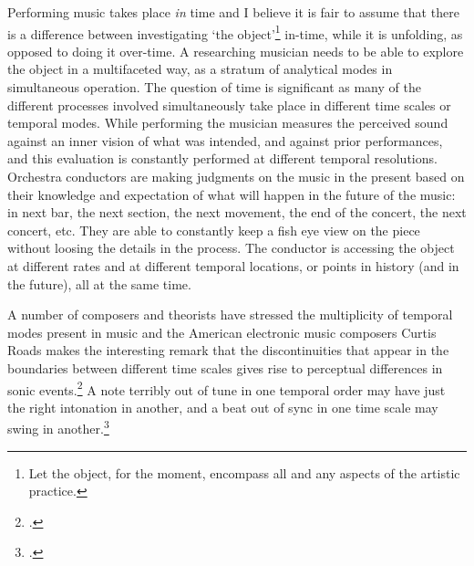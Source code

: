 Performing music takes place \emph{in} time and I believe it is fair to assume that there is a difference between investigating `the object'\footnote{Let the object, for the moment, encompass all and any aspects of the artistic practice.} in-time, while it is unfolding, as opposed to doing it over-time. A researching musician needs to be able to explore the object in a multifaceted way, as a stratum of analytical modes in simultaneous operation. The question of time is significant as many of the different processes involved simultaneously take place in  different time scales or temporal modes. While performing the musician measures the perceived sound against an inner vision of what was intended, and against prior performances, and this evaluation is constantly performed at different temporal resolutions. Orchestra conductors are making judgments on the music in the present based on their knowledge and expectation of what will happen in the future of the music: in next bar, the next section, the next movement, the end of the concert, the next concert, etc. They are able to constantly keep a fish eye view on the piece without loosing the details in the process. The conductor is accessing the object at different rates and at different temporal locations, or points in history (and in the future), all at the same time. 

A number of composers and theorists have stressed the multiplicity of temporal modes present in music and the American electronic music composers Curtis Roads makes the interesting remark that the discontinuities that appear in the boundaries between different time scales gives rise to perceptual differences in sonic events.\footcite[4]{roads}  A note terribly out of tune in one temporal order may have just the right intonation in another, and a beat out of sync in one time scale may swing in another.\footcite[For an example of the great variation in rhythmic timing among jazz musicians when observed at high temporal resolution, see][]{friberg02} 

